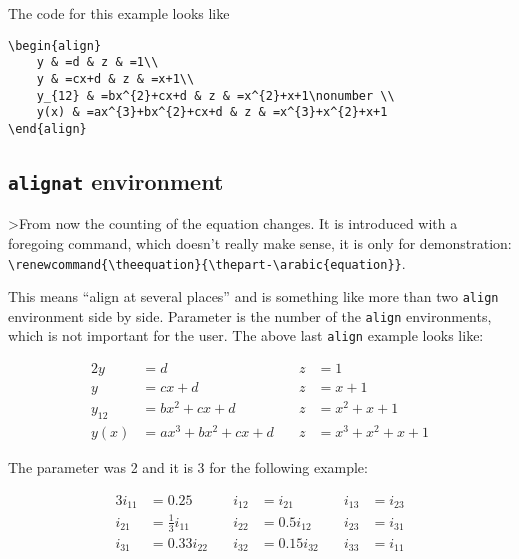 \begin{table}[htb]
\begin{itemize}
\end{itemize}
The code for this example looks like%
\begin{lstlisting}
\begin{align}
	y & =d & z & =1\\
	y & =cx+d & z & =x+1\\
	y_{12} & =bx^{2}+cx+d & z & =x^{2}+x+1\nonumber \\
	y(x) & =ax^{3}+bx^{2}+cx+d & z & =x^{3}+x^{2}+x+1
\end{align}
\end{lstlisting}

\subsection{\texttt{alignat} environment\label{sec:alignat environment}}
\renewcommand{\theequation}{%
  \thepart-\arabic{equation}%
}

\begin{leftbar}
>From now the counting of the equation changes. It is introduced with a foregoing command,
which doesn't really make sense, it is only for demonstration:\\
\verb|\renewcommand{\theequation}{\thepart-\arabic{equation}}|.
\end{leftbar}


This means  ``align at several places{}'' and is something like
more than two \verb+align+ environment side by side.
Parameter is the number of the \verb+align+ environments, which
is not important for the user. The
above last \verb+align+ example looks like:

\begin{alignat}{2}
y & =d & z & =1\label{eq:newCounting}\\
y & =cx+d & z & =x+1\\
y_{12} & =bx^{2}+cx+d & z & =x^{2}+x+1\nonumber \\
y(x) & =ax^{3}+bx^{2}+cx+d\quad & z & =x^{3}+x^{2}+x+1\end{alignat}


The parameter was 2 and it is 3 for the following example:    %

\begin{alignat}{3}
i_{11} & =0.25 & i_{12} & =i_{21} & i_{13} & =i_{23}\nonumber \\
i_{21} & =\frac{1}{3}i_{11} & i_{22} & =0.5i_{12} & i_{23} & =i_{31}\\
i_{31} & =0.33i_{22}\quad & i_{32} & =0.15i_{32}\quad & i_{33} & =i_{11}\end{alignat}



\end{table}
